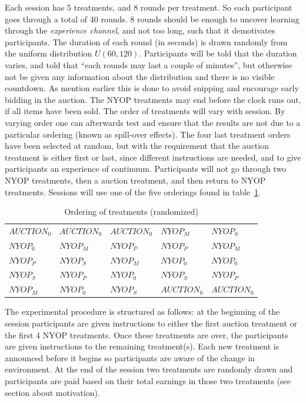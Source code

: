 \documentclass[a4paper,12pt]{article}
\begin{document}
	Each session has 5 treatments, and 8 rounds per treatment. So each participant goes through a total of 40 rounds. 8 rounds should be enough to uncover learning through the \emph{experience channel}, and not too long, such that it demotivates participants. The duration of each round (in seconds) is drawn randomly from the uniform distribution $U(60, 120)$. Participants will be told that the duration varies, and told that ``each rounds may last a couple of minutes'', but otherwise not be given any information about the distribution and there is no visible countdown. As mention earlier this is done to avoid snipping and encourage early bidding in the auction. The NYOP treatments may end before the clock runs out, if all items have been sold. The order of treatments will vary with session. By varying order one can afterwards test and ensure that the results are not due to a particular ordering (known as spill-over effects). The four last treatment orders have been selected at random, but with the requirement that the auction treatment is either first or last, since different instructions are needed, and to give participants an experience of continuum. Participants will not go through two NYOP treatments, then a auction treatment, and then return to NYOP treatments. Sessions will use one of the five orderings found in table~\ref{tab:order}.

	\begin{table}[ht]
		\caption{Ordering of treatments (randomized)}
		\begin{tabular}{l | l | l | l | l}
			$AUCTION_0$	& $AUCTION_0$ 	& $AUCTION_0$ 	& $NYOP_M$ 		& $NYOP_S$ 	\\
			$NYOP_0$ 	& $NYOP_M$		& $NYOP_P$		& $NYOP_P$		& $NYOP_M$	\\
			$NYOP_P$ 	& $NYOP_S$		& $NYOP_M$		& $NYOP_0$		& $NYOP_0$	\\
			$NYOP_S$	& $NYOP_P$		& $NYOP_0$		& $NYOP_S$		& $NYOP_P$	\\
			$NYOP_M$	& $NYOP_0$		& $NYOP_S$		& $AUCTION_0$	& $AUCTION_0$	
		\end{tabular}
		\label{tab:order}
	\end{table}
	
	The experimental procedure is structured as follows: at the beginning of the session participants are given instructions to either the first auction treatment or the first 4 NYOP treatments. Once these treatments are over, the participants are given instructions to the remaining treatment(s). Each new treatment is announced before it begins so participants are aware of the change in environment. At the end of the session two treatments are randomly drawn and participants are paid based on their total earnings in those two treatments (see section about motivation).
\end{document}
